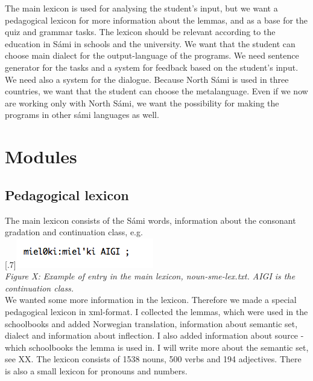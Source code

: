 \documentclass[a4paper,12pt]{article}
\begin{document}
The main lexicon is used for analysing the student’s input, but we want a pedagogical lexicon for more information about the lemmas, and as a base for the quiz and grammar tasks. The lexicon should be relevant according to the education in Sámi in schools and the university. We want that the student can choose main dialect for the output-language of the programs. We need sentence generator for the tasks and a system for feedback based on the student’s input. We need also a system for the dialogue. Because North Sámi is used in three countries, we want that the student can choose the metalanguage. Even if we now are working only with North Sámi, we want the possibility for making the programs in other sámi languages as well.

\section{Modules}

\subsection{Pedagogical lexicon}

The main lexicon consists of the Sámi words, information about the consonant gradation and continuation class, e.g. \\


\scalebox{.7}[.7]{\includegraphics{img/noun-sme-lex.png}}\\
\textit{Figure X: Example of entry in the main lexicon, noun-sme-lex.txt. AIGI is the continuation class.}\\


We wanted some more information in the lexicon. Therefore we made a special pedagogical lexicon in xml-format. I collected the lemmas, which were used in the schoolbooks and added Norwegian translation, information about semantic set, dialect and information about inflection. I also added information about source - which schoolbooks the lemma is used in. I will write more about the semantic set, see XX. The lexicon consists of 1538 nouns, 500 verbs and 194 adjectives. There is also a small lexicon for pronouns and numbers. \\
\end{document}
